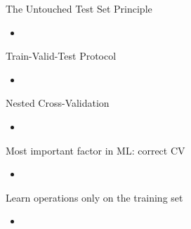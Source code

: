 \documentclass[11pt,compress,t,notes=noshow, aspectratio=169, xcolor=table]{beamer}
\begin{document}
\begin{frame}{The Untouched Test Set Principle}

\begin{itemize}
\setlength\itemsep{2em}
    \item 
\end{itemize}
\end{frame}

\begin{frame}{Train-Valid-Test Protocol}

\begin{itemize}
\setlength\itemsep{2em}
    \item 
\end{itemize}
\end{frame}

\begin{frame}{Nested Cross-Validation}

\begin{itemize}
\setlength\itemsep{2em}
    \item 
\end{itemize}
\end{frame}

\begin{frame}{Most important factor in ML: correct CV}

\begin{itemize}
\setlength\itemsep{2em}
    \item 
\end{itemize}
\end{frame}

\begin{frame}{Learn operations only on the training set}

\begin{itemize}
\setlength\itemsep{2em}
    \item 
\end{itemize}
\end{frame}

\endlecture
\end{document}
